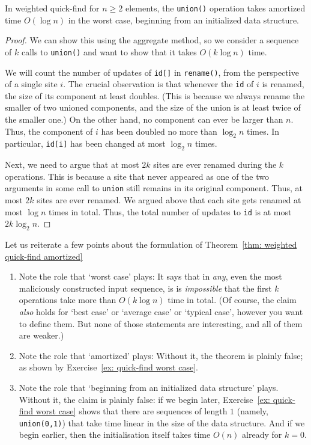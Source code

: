 \documentclass{tstextbook}
\begin{document}
\begin{theorem}\label{thm: weighted quick-find amortized}
  In weighted quick-find for $n\geq 2$ elements, the {\tt union()} operation takes amortized time $O(\log n)$ in the worst case, beginning from an initialized data structure.
\end{theorem}

\begin{proof}
We can show this using the aggregate method, so we consider a sequence of $k$ calls to {\tt union()} and want to show that it takes $O(k\log n)$ time.

We will count the number of updates of {\tt id[]} in {\tt rename()}, from the perspective of a single site $i$. 
The crucial observation is that whenever the {\tt id} of $i$ is renamed, the size of its component at least doubles.
(This is because we always rename the smaller of two unioned components, and the size of the union is at least twice of the smaller one.)
On the other hand, no component can ever be larger than $n$. 
Thus, the component of $i$ has been doubled no more than $\log_2 n$ times.
In particular, {\tt id[i]} has been changed at most $\log_2 n$ times.

Next, we need to argue that at most $2k$ sites are ever renamed during the $k$ operations.
This is because a site that never appeared as one of the two arguments in some call to {\tt union} still remains in its original component.
Thus, at most $2k$ sites are ever renamed.
We argued above that each site gets renamed at most $\log n$ times in total.
Thus, the total number of updates to {\tt id} is at most $2k\log_2 n$. 
\end{proof}

Let us reiterate a few points about the formulation of Theorem~\ref{thm: weighted quick-find amortized}
\begin{enumerate}
  \item  Note the role that `worst case' plays:
    It says that in \emph{any}, even the most maliciously constructed input sequence, is is \emph{impossible} that the first $k$ operations take more than $O(k\log n)$ time in total.
    (Of course, the claim \emph{also} holds for `best case' or `average case' or `typical case', however you want to define them.
    But none of those statements are interesting, and all of them are weaker.)
\item Note the role that `amortized' plays:
  Without it, the theorem is plainly false; as shown by Exercise~\ref{ex: quick-find worst case}.
\item Note the role that `beginning from an initialized data structure' plays. 
  Without it, the claim is plainly false: if we begin later, Exercise~\ref{ex: quick-find worst case} shows that there are sequences of length $1$ (namely, \texttt{union(0,1)}) that take time linear in the size of the data structure.
    And if we begin earlier, then the initialisation itself takes time $O(n)$ already for $k=0$.
\end{enumerate}
\end{document}

